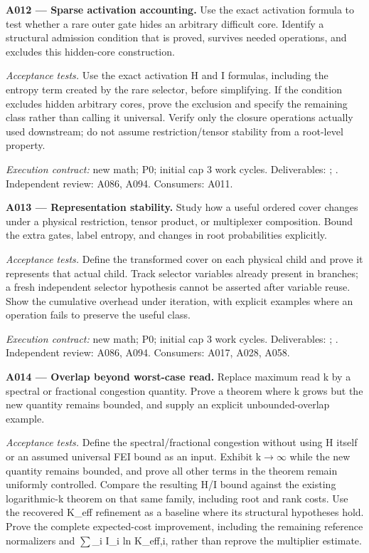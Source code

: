 \documentclass[11pt]{article}
\begin{document}
\textbf{A012 --- Sparse activation accounting.} Use the exact activation formula to test whether a rare outer gate hides an arbitrary difficult core. Identify a structural admission condition that is proved, survives needed operations, and excludes this hidden-core construction.

\emph{Acceptance tests.} Use the exact activation H and I formulas, including the entropy term created by the rare selector, before simplifying. If the condition excludes hidden arbitrary cores, prove the exclusion and specify the remaining class rather than calling it universal. Verify only the closure operations actually used downstream; do not assume restriction/tensor stability from a root-level property.

{\small\emph{Execution contract:} new math; P0; initial cap 3 work cycles. Deliverables: ; . Independent review: A086, A094. Consumers: A011.}

\textbf{A013 --- Representation stability.} Study how a useful ordered cover changes under a physical restriction, tensor product, or multiplexer composition. Bound the extra gates, label entropy, and changes in root probabilities explicitly.

\emph{Acceptance tests.} Define the transformed cover on each physical child and prove it represents that actual child. Track selector variables already present in branches; a fresh independent selector hypothesis cannot be asserted after variable reuse. Show the cumulative overhead under iteration, with explicit examples where an operation fails to preserve the useful class.

{\small\emph{Execution contract:} new math; P0; initial cap 3 work cycles. Deliverables: ; . Independent review: A086, A094. Consumers: A017, A028, A058.}

\textbf{A014 --- Overlap beyond worst-case read.} Replace maximum read k by a spectral or fractional congestion quantity. Prove a theorem where k grows but the new quantity remains bounded, and supply an explicit unbounded-overlap example.

\emph{Acceptance tests.} Define the spectral/fractional congestion without using H itself or an assumed universal FEI bound as an input. Exhibit k$\to$$\infty$ while the new quantity remains bounded, and prove all other terms in the theorem remain uniformly controlled. Compare the resulting H/I bound against the existing logarithmic-k theorem on that same family, including root and rank costs. Use the recovered K\_eff refinement as a baseline where its structural hypotheses hold. Prove the complete expected-cost improvement, including the remaining reference normalizers and $\sum$\_i I\_i ln K\_eff,i, rather than reprove the multiplier estimate.
\end{document}
